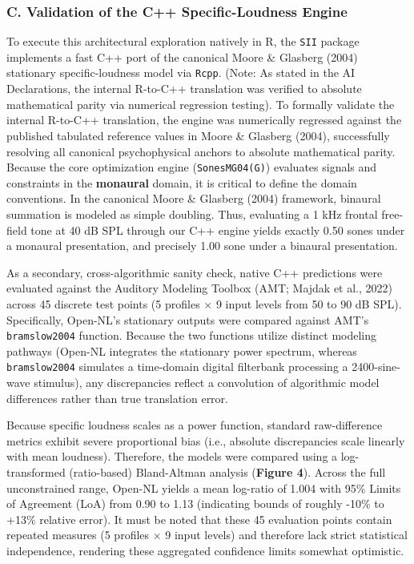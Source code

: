 \documentclass[
  12pt,
]{article}
\begin{document}
\subsubsection{C. Validation of the C++ Specific-Loudness
Engine}\label{c.-validation-of-the-c-specific-loudness-engine}

To execute this architectural exploration natively in R, the
\texttt{SII} package implements a fast C++ port of the canonical Moore
\& Glasberg (2004) stationary specific-loudness model via \texttt{Rcpp}.
(Note: As stated in the AI Declarations, the internal R-to-C++
translation was verified to absolute mathematical parity via numerical
regression testing). To formally validate the internal R-to-C++
translation, the engine was numerically regressed against the published
tabulated reference values in Moore \& Glasberg (2004), successfully
resolving all canonical psychophysical anchors to absolute mathematical
parity. Because the core optimization engine (\texttt{SonesMG04(G)})
evaluates signals and constraints in the \textbf{monaural} domain, it is
critical to define the domain conventions. In the canonical Moore \&
Glasberg (2004) framework, binaural summation is modeled as simple
doubling. Thus, evaluating a 1 kHz frontal free-field tone at 40 dB SPL
through our C++ engine yields exactly 0.50 sones under a monaural
presentation, and precisely 1.00 sone under a binaural presentation.

As a secondary, cross-algorithmic sanity check, native C++ predictions
were evaluated against the Auditory Modeling Toolbox (AMT; Majdak et
al., 2022) across 45 discrete test points (5 profiles \(\times\) 9 input
levels from 50 to 90 dB SPL). Specifically, Open-NL's stationary outputs
were compared against AMT's \texttt{bramslow2004} function. Because the
two functions utilize distinct modeling pathways (Open-NL integrates the
stationary power spectrum, whereas \texttt{bramslow2004} simulates a
time-domain digital filterbank processing a 2400-sine-wave stimulus),
any discrepancies reflect a convolution of algorithmic model differences
rather than true translation error.

Because specific loudness scales as a power function, standard
raw-difference metrics exhibit severe proportional bias (i.e., absolute
discrepancies scale linearly with mean loudness). Therefore, the models
were compared using a log-transformed (ratio-based) Bland-Altman
analysis (\textbf{Figure 4}). Across the full unconstrained range,
Open-NL yields a mean log-ratio of 1.004 with 95\% Limits of Agreement
(LoA) from 0.90 to 1.13 (indicating bounds of roughly -10\% to +13\%
relative error). It must be noted that these 45 evaluation points
contain repeated measures (5 profiles \(\times\) 9 input levels) and
therefore lack strict statistical independence, rendering these
aggregated confidence limits somewhat optimistic.
\end{document}
